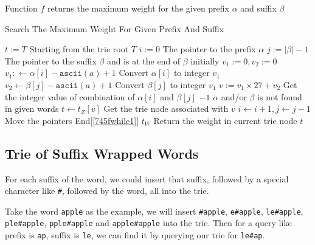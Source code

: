 Function $f$ returns the maximum weight for the given prefix $\alpha$ and suffix $\beta$
\begin{algorithm}[H]
\caption{Search The Maximum Weight For Given Prefix And Suffix}
\begin{algorithmic}[1]
\State $t:=T$ \Comment Starting from the trie root $T$
\State $i:=0$ \Comment The pointer to the prefix $\alpha$
\State $j:=|\beta| - 1$ \Comment The pointer to the suffix $\beta$ and is at the end of $\beta$ initially
 \label{745fwhile1}
\State $v_1:=0, v_2:=0$
\State $v_1:\gets\alpha[i] - \texttt{ascii}(a) + 1$ \Comment Convert $\alpha[i]$ to integer $v_1$
\EndIf
{}
\State $v_2\gets\beta[j] - \texttt{ascii}(a) + 1$ \Comment Convert $\beta[j]$ to integer $v_1$
\EndIf
\State $v:=v_1\times 27 + v_2$ \Comment Get the integer value of combination of $\alpha[i]$ and $\beta[j]$
\State \Return $-1$ \Comment $\alpha$ and/or $\beta$ is not found in given words
\Else
\State $t\gets t_{Z}[v]$ \Comment Get the trie node associated with $v$
\EndIf
\State $i\gets i+1, j\gets j-1$ \Comment Move the pointers 
\EndWhile \Comment End[\ref{745fwhile1}]
\State \Return $t_{W}$ \Comment Return the weight in current trie node $t$
\EndProcedure
\end{algorithmic}
\end{algorithm}
\subsection{Trie of Suffix Wrapped Words}
For each suffix of the word, we could insert that suffix, followed by a special character like \texttt{\#}, followed by the word, all into the trie.
\par
Take the word \texttt{apple} as the example, we will insert \texttt{\#apple}, \texttt{e\#apple}, \texttt{le\#apple}, \texttt{ple\#apple}, \texttt{pple\#apple} and \texttt{apple\#apple} into the trie. Then for a query like prefix is \texttt{ap}, suffix is \texttt{le}, we can find it by querying our trie for \texttt{le\#ap}.
